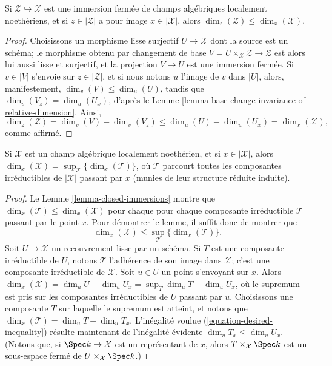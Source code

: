 \begin{lemma}
\label{lemma-closed-immersions}
Si $\mathcal{Z} \hookrightarrow \mathcal{X}$ est une immersion fermée
de champs algébriques localement noethériens,
et si $z \in |\mathcal{Z}|$ a pour image $x \in |\mathcal{X}|$,
alors $\dim_z (\mathcal{Z}) \leq \dim_x(\mathcal{X})$.
\end{lemma}

\begin{proof}
Choisissons un morphisme lisse surjectif
$U\to \mathcal{X}$ dont la source est un schéma;
le morphisme obtenu par changement de base
$V = U\times_{\mathcal{X}} \mathcal{Z} \to \mathcal{Z}$
est alors lui aussi lisse et surjectif, et la projection
$V \to U$ est une immersion fermée.
Si $v \in |V|$ s'envoie sur $z \in |\mathcal{Z}|$, et
si nous notons $u$ l'image de $v$ dans $|U|$,
alors, manifestement,
$\dim_v(V) \leq \dim_u(U)$,
tandis que
$\dim_v (V_z) = \dim_u(U_x)$,
d'après le Lemme \ref{lemma-base-change-invariance-of-relative-dimension}.
Ainsi,
$$
\dim_z(\mathcal{Z})  = \dim_v(V) - \dim_v(V_z)
\leq \dim_u(U) - \dim_u(U_x) = \dim_x(\mathcal{X}),
$$
comme affirmé.
\end{proof}

\begin{lemma}
\label{lemma-dimension-via-components}
Si $\mathcal{X}$ est un champ algébrique localement noethérien, et si
$x \in |\mathcal{X}|$,
alors $\dim_x(\mathcal{X}) = \sup_{\mathcal{T}} \{ \dim_x(\mathcal{T}) \} $,
où $\mathcal{T}$ parcourt toutes les composantes irréductibles
de $|\mathcal{X}|$ passant par $x$ (munies de leur
structure réduite induite).
\end{lemma}

\begin{proof}
Le Lemme \ref{lemma-closed-immersions}
montre que
$\dim_x (\mathcal{T}) \leq \dim_x(\mathcal{X})$ pour chaque
pour chaque composante irréductible $\mathcal{T}$ passant par
le point $x$. Pour démontrer le lemme,
il suffit donc de montrer que
\begin{equation}
\label{equation-desired-inequality}
\dim_x(\mathcal{X}) \leq
\sup_{\mathcal{T}} \{\dim_x(\mathcal{T})\}.
\end{equation}
Soit $U\to\mathcal{X}$ un recouvrement lisse par un schéma. Si $T$ est une composante
irréductible de $U$, notons $\mathcal{T}$ l'adhérence de son image
dans $\mathcal{X}$; c'est une composante irréductible de $\mathcal{X}$. Soit
$u \in U$
un point s'envoyant sur $x$. Alors
$\dim_x(\mathcal{X})=\dim_uU-\dim_uU_x=\sup_T\dim_uT-\dim_uU_x$, où le
supremum est pris sur les composantes irréductibles de $U$ passant
par $u$. Choisissons une composante $T$ sur laquelle le supremum
est atteint, et notons que
$\dim_x(\mathcal{T})=\dim_uT-\dim_u T_x$.
L'inégalité voulue (\ref{equation-desired-inequality})
résulte maintenant de l'inégalité évidente $\dim_u T_x \leq \dim_u U_x.$
(Notons que, si $\Spec k \to \mathcal{X}$ est un représentant de $x$,
alors $T\times_{\mathcal{X}} \Spec k$ est un sous-espace fermé de
$U\times_{\mathcal{X}}
\Spec k$.)
\end{proof}

